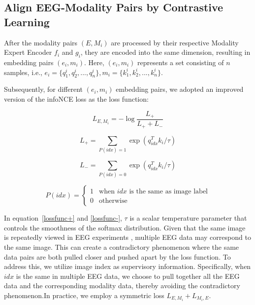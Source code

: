 \documentclass[letterpaper]{article} %
\begin{document}
\subsection{Align EEG-Modality Pairs by Contrastive Learning}

After the modality pairs $(E, M_{i})$ are processed by their respective Modality Expert Encoder $f_{i}$ and $g_{i}$, they are encoded into the same dimension, resulting in embedding pairs $(e_{i}, m_{i})$. Here, $(e_{i}, m_{i})$ represents a set consisting of $n$ samples, i.e., $e_i = \{q^i_1, q^i_2, ..., q^i_n\},m_i = \{k^i_1, k^i_2, ..., k^i_n\}$.

Subsequently, for different $(e_{i}, m_{i})$ embedding pairs, we adopted an improved version of the infoNCE loss \cite{oord2019representationlearningcontrastivepredictive} as the loss function:


\begin{equation}
L_{E,M_{i}} = -\log\frac{L_{+}} 
{L_{+} + L_{-}}
\label{lossfunc}
\end{equation}

\begin{equation}
L_{+} = \sum_{P(idx) = 1}\exp(q^T_{idx} k_i / \tau)
\label{lossfunc+}
\end{equation}

\begin{equation}
L_{-} = \sum_{P(idx) = 0} \exp(q^T_{idx} k_i / \tau)
\label{lossfunc-}
\end{equation}

\begin{equation}
P(idx) =
\begin{cases}
1 & \text{when $idx$ is the same as image label} \\
0 & \text{otherwise}
\end{cases}
\end{equation}

In equation~\eqref{lossfunc+} and \eqref{lossfunc-}, $\tau$ is a scalar temperature parameter that controls the smoothness of the softmax distribution. Given that the same image is repeatedly viewed in EEG experiments \cite{gifford2022large}, multiple EEG data may correspond to the same image. This can create a contradictory phenomenon where the same data pairs are both pulled closer and pushed apart by the loss function. To address this, we utilize image index as supervisory information. Specifically, when $idx$ is the same in multiple EEG data, we choose to pull together all the EEG data and the corresponding modality data, thereby avoiding the contradictory phenomenon.In practice, we employ a symmetric loss $L_{E,M_{i}} + L_{M_{i},E}$. 
\end{document}
